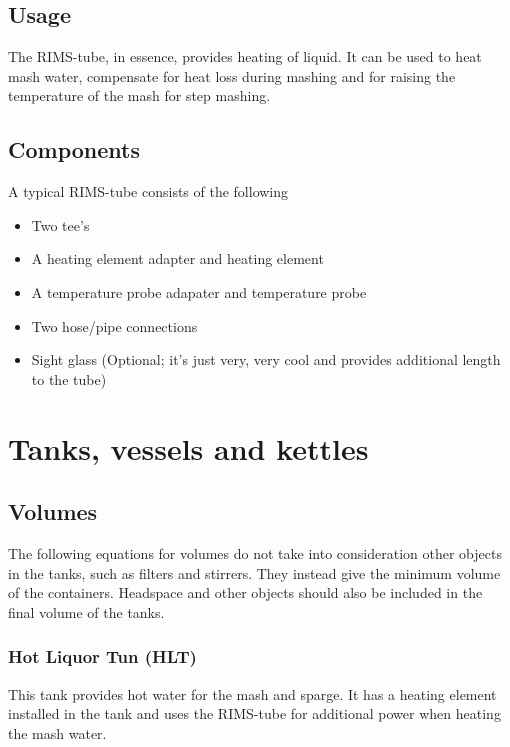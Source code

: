 \documentclass[11pt,fleqn,openany]{book} %
\begin{document}
\section{Usage}

The RIMS-tube, in essence, provides heating of liquid. It can be used to heat mash water, compensate for heat loss during mashing and for raising the temperature of the mash for step mashing. 

\section{Components}

A typical RIMS-tube consists of the following

\begin{itemize}
\item Two tee's
\item A heating element adapter and heating element
\item A temperature probe adapater and temperature probe
\item Two hose/pipe connections
\item Sight glass (Optional; it's just very, very cool and provides additional length to the tube)
\end{itemize}



\chapter{Tanks, vessels and kettles}

\section{Volumes}

The following equations for volumes do not take into consideration other objects in the tanks, such as filters and stirrers. They instead give the minimum volume of the containers. Headspace and other objects should also be included in the final volume of the tanks.

\subsection{Hot Liquor Tun (HLT)}

This tank provides hot water for the mash and sparge. It has a heating element installed in the tank and uses the RIMS-tube for additional power when heating the mash water.
\end{document}
